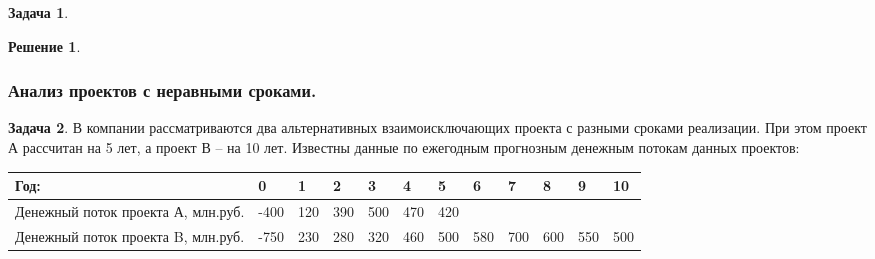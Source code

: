 \documentclass[a4paper, 14pt]{article}
\theoremstyle{plain} %
\theoremstyle{definition} %
\newtheorem*{solution}{Решение}
\newtheorem{problem}{Задача}[subsection]
\theoremstyle{remark} %
\begin{document}
\begin{problem}
    \begin{solution}

    \end{solution}
\end{problem}
\newpage

\subsubsection{Анализ проектов с неравными сроками.}
\begin{problem}
	В компании рассматриваются два альтернативных взаимоисключающих проекта с разными сроками реализации. При этом проект А рассчитан на 5 лет, а проект В – на 10 лет. Известны данные по ежегодным прогнозным денежным потокам данных проектов:
\begin{center}
\begin{tabular}[0.88\textwidth]{|p{4cm}|l|l|l|l|l|l|l|l|l|l|l|}
\hline
Год:                               & 0    & 1   & 2   & 3   & 4   & 5   & 6   & 7   & 8   & 9   & 10   \\
\hline
Денежный поток проекта А, млн.руб. & -400 & 120 & 390 & 500 & 470 & 420 &     &     &     &     &      \\
\hline
Денежный поток проекта B, млн.руб. & -750 & 230 & 280 & 320 & 460 & 500 & 580 & 700 & 600 & 550 & 500  \\
\hline
\end{tabular}
\end{center}


\end{problem}
\end{document}
